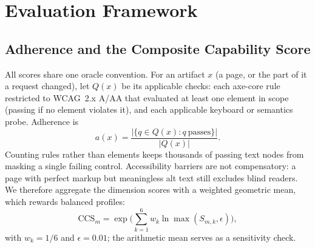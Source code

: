 \documentclass[10pt,conference]{IEEEtran}
\begin{document}
\section{Evaluation Framework}\label{sec:framework}

\subsection{Adherence and the Composite Capability Score}
All scores share one oracle convention. For an artifact $x$ (a page, or the part of it a request changed), let $Q(x)$ be its applicable checks: each axe-core rule~\cite{axecore} restricted to WCAG~2.x A/AA that evaluated at least one element in scope (passing if no element violates it), and each applicable keyboard or semantics probe. Adherence is
\begin{equation}
a(x)=\frac{|\{q\in Q(x): q\ \text{passes}\}|}{|Q(x)|}.
\end{equation}
Counting rules rather than elements keeps thousands of passing text nodes from masking a single failing control. Accessibility barriers are not compensatory: a page with perfect markup but meaningless alt text still excludes blind readers. We therefore aggregate the dimension scores with a weighted geometric mean, which rewards balanced profiles:
\begin{equation}
\mathrm{CCS}_m=\exp\Big(\textstyle\sum_{k=1}^{6} w_k \ln \max(S_{m,k},\epsilon)\Big),
\end{equation}
with $w_k=1/6$ and $\epsilon=0.01$; the arithmetic mean serves as a sensitivity check.
\end{document}
